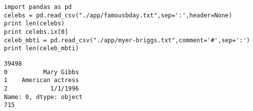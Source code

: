 \documentclass[12pt,fleqn]{article}\usepackage{common}
\begin{document}
\begin{verbatim}
import pandas as pd
celebs = pd.read_csv("./app/famousbday.txt",sep=':',header=None)
print len(celebs)
print celebs.ix[0]
celeb_mbti = pd.read_csv("./app/myer-briggs.txt",comment='#',sep=':')
print len(celeb_mbti)
\end{verbatim}

\begin{verbatim}
39498
0          Mary Gibbs
1    American actress
2            1/1/1996
Name: 0, dtype: object
715
\end{verbatim}
\end{document}
